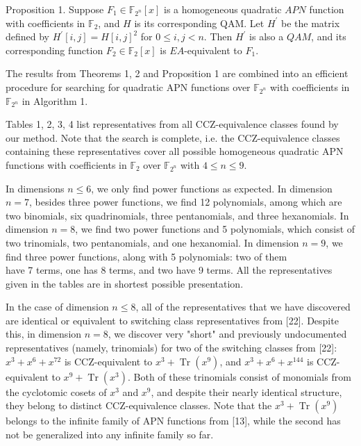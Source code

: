 \documentclass[10pt]{article}
\begin{document}
Proposition 1. Suppose $F_{1} \in \mathbb{F}_{2^{n}}[x]$ is a homogeneous quadratic $A P N$ function with coefficients in $\mathbb{F}_{2}$, and $H$ is its corresponding QAM. Let $H^{\prime}$ be the matrix defined by $H^{\prime}[i, j]=H[i, j]^{2}$ for $0 \leq i, j<n$. Then $H^{\prime}$ is also a $Q A M$, and its corresponding function $F_{2} \in \mathbb{F}_{2}[x]$ is $E A$-equivalent to $F_{1}$.

The results from Theorems 1, 2 and Proposition 1 are combined into an efficient procedure for searching for quadratic APN functions over $\mathbb{F}_{2^{n}}$ with coefficients in $\mathbb{F}_{2^{n}}$ in Algorithm 1.

Tables 1, 2, 3, 4 list representatives from all CCZ-equivalence classes found by our method. Note that the search is complete, i.e. the CCZ-equivalence classes containing these representatives cover all possible homogeneous quadratic APN functions with coefficients in $\mathbb{F}_{2}$ over $\mathbb{F}_{2^{n}}$ with $4 \leq n \leq 9$.

In dimensions $n \leq 6$, we only find power functions as expected. In dimension $n=7$, besides three power functions, we find 12 polynomials, among which are two binomials, six quadrinomials, three pentanomials, and three hexanomials. In dimension $n=8$, we find two power functions and 5 polynomials, which consist of two trinomials, two pentanomials, and one hexanomial. In dimension $n=9$, we find three power functions, along with 5 polynomials: two of them\\
have 7 terms, one has 8 terms, and two have 9 terms. All the representatives given in the tables are in shortest possible presentation.

In the case of dimension $n \leq 8$, all of the representatives that we have discovered are identical or equivalent to switching class representatives from [22]. Despite this, in dimension $n=8$, we discover very "short" and previously undocumented representatives (namely, trinomials) for two of the switching classes from [22]: $x^{3}+x^{6}+x^{72}$ is CCZ-equivalent to $x^{3}+\operatorname{Tr}\left(x^{9}\right)$, and $x^{3}+x^{6}+x^{144}$ is CCZ-equivalent to $x^{9}+\operatorname{Tr}\left(x^{3}\right)$. Both of these trinomials consist of monomials from the cyclotomic cosets of $x^{3}$ and $x^{9}$, and despite their nearly identical structure, they belong to distinct CCZ-equivalence classes. Note that the $x^{3}+\operatorname{Tr}\left(x^{9}\right)$ belongs to the infinite family of APN functions from [13], while the second has not be generalized into any infinite family so far.
\end{document}
